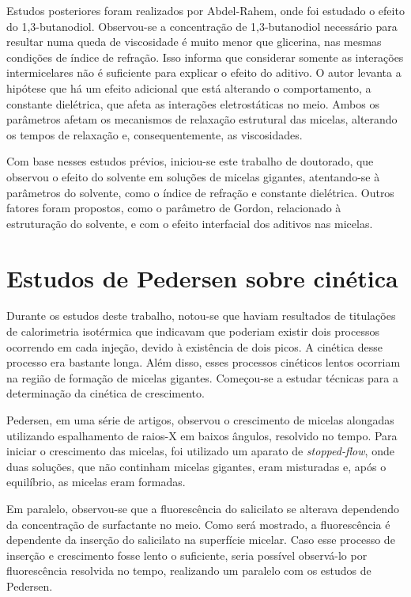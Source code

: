 		Estudos posteriores foram realizados por Abdel-Rahem, onde foi estudado o efeito do 1,3-butanodiol. Observou-se a concentração de 1,3-butanodiol necessário para resultar numa queda de viscosidade é muito menor que glicerina, nas mesmas condições de índice de refração. Isso informa que considerar somente as interações intermicelares não é suficiente para explicar o efeito do aditivo. O autor levanta a hipótese que há um efeito adicional que está alterando o comportamento, a constante dielétrica, que afeta as interações eletrostáticas no meio. Ambos os parâmetros afetam os mecanismos de relaxação estrutural das micelas, alterando os tempos de relaxação e, consequentemente, as viscosidades.
		
		Com base nesses estudos prévios, iniciou-se este trabalho de doutorado, que observou o efeito do solvente em soluções de micelas gigantes, atentando-se à parâmetros do solvente, como o índice de refração e constante dielétrica. Outros fatores foram propostos, como o parâmetro de Gordon, relacionado à estruturação do solvente, e com o efeito interfacial dos aditivos nas micelas.
		
		\section{Estudos de Pedersen sobre cinética}

		
		Durante os estudos deste trabalho, notou-se que haviam resultados de titulações de calorimetria isotérmica que indicavam que poderiam existir dois processos ocorrendo em cada injeção, devido à existência de dois picos. A cinética desse processo era bastante longa. Além disso, esses processos cinéticos lentos ocorriam na região de formação de micelas gigantes. Começou-se a estudar técnicas para a determinação da cinética de crescimento.
		
		Pedersen, em uma série de artigos, observou o crescimento de micelas alongadas utilizando espalhamento de raios-X em baixos ângulos, resolvido no tempo. Para iniciar o crescimento das micelas, foi utilizado um aparato de \emph{stopped-flow}, onde duas soluções, que não continham micelas gigantes, eram misturadas e, após o equilíbrio, as micelas eram formadas.
		
		Em paralelo, observou-se que a fluorescência do salicilato se alterava dependendo da concentração de surfactante no meio. Como será mostrado, a fluorescência é dependente da inserção do salicilato na superfície micelar. Caso esse processo de inserção e crescimento fosse lento o suficiente, seria possível observá-lo por fluorescência resolvida no tempo, realizando um paralelo com os estudos de Pedersen.
		
